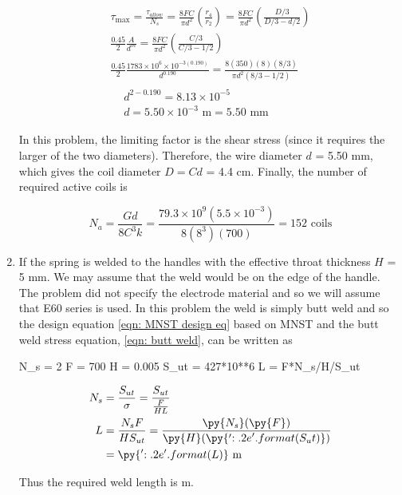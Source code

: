 \documentclass[
10pt,
a4paper,
openany,
svgnames,
]{book}
\begin{document}
\begin{enumerate}
  \begin{gather*}
    \tau_{\max} = \frac{\tau_{allow}}{N_s} = \frac{8FC}{\pi d^2}\left( \frac{r_4}{r_2} \right) = \frac{8FC}{\pi d^2}\left( \frac{D/3}{D/3 - d/2} \right) \\ 
    \frac{0.45}{2}\frac{A}{d^m} = \frac{8FC}{\pi d^2}\left( \frac{C/3}{C/3 - 1/2} \right) \\ 
    \frac{0.45}{2}\frac{1783 \times 10^6 \times 10^{-3(0.190)}}{d^{0.190}} = \frac{8(350)(8)(8/3)}{\pi d^2(8/3 - 1/2)} \\
    \begin{aligned}
      &d^{2-0.190} = 8.13 \times 10^{-5} \\ 
      &d = 5.50 \times 10^{-3}\text{ m} = 5.50 \text{ mm}
    \end{aligned}
  \end{gather*}

  In this problem, the limiting factor is the shear stress (since it requires the larger of the two diameters). Therefore, the wire diameter $d$ = 5.50 mm, which gives the coil diameter $D = Cd$ = 4.4 cm. Finally, the number of required active coils is

  \[N_a = \frac{Gd}{8C^3k} = \frac{79.3 \times 10^9(5.5 \times 10^{-3})}{8(8^3)(700)} = 152\text{ coils}\]

\item If the spring is welded to the handles with the effective throat thickness $H$ = 5 mm. We may assume that the weld would be on the edge of the handle. The problem did not specify the electrode material and so we will assume that E60 series is used. In this problem the weld is simply butt weld and so the design equation \cref{eqn: MNST design eq} based on MNST and the butt weld stress equation, \cref{eqn: butt weld}, can be written as 

  \begin{pycode}
    N_s = 2
    F = 700
    H = 0.005
    S_ut = 427*10**6
    L = F*N_s/H/S_ut
  \end{pycode}

  \begin{align*}
    N_s &= \frac{S_{ut}}{\sigma} = \frac{S_{ut}}{\frac{F}{HL}} \\
    L &= \frac{N_s F}{H S_{ut}} = \frac{\py{N_s}(\py{F})}{\py{H}(\py{'{:.2e}'.format(S_ut)})} \\
        &= \py{'{:.2e}'.format(L)} \text{ m}
  \end{align*}

  Thus the required weld length is  m.


\end{enumerate}
\end{document}
